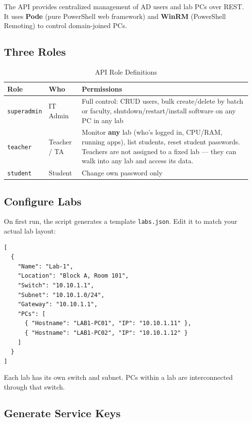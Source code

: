 ﻿\documentclass[12pt,a4paper]{article}
\begin{document}
The API provides centralized management of AD users and lab PCs over REST. It uses \textbf{Pode} (pure PowerShell web framework) and \textbf{WinRM} (PowerShell Remoting) to control domain-joined PCs.

\subsection{Three Roles}

\begin{table}[H]
\centering
\begin{tabularx}{\textwidth}{l l X}
\toprule
\textbf{Role} & \textbf{Who} & \textbf{Permissions} \\
\midrule
\texttt{superadmin} & IT Admin & Full control: CRUD users, bulk create/delete by batch or faculty, shutdown/restart/install software on any PC in any lab \\
\texttt{teacher} & Teacher / TA & Monitor \textbf{any} lab (who's logged in, CPU/RAM, running apps), list students, reset student passwords. Teachers are not assigned to a fixed lab --- they can walk into any lab and access its data. \\
\texttt{student} & Student & Change own password only \\
\bottomrule
\end{tabularx}
\caption{API Role Definitions}
\end{table}

\subsection{Configure Labs}

On first run, the script generates a template \texttt{labs.json}. Edit it to match your actual lab layout:

\begin{lstlisting}
[
  {
    "Name": "Lab-1",
    "Location": "Block A, Room 101",
    "Switch": "10.10.1.1",
    "Subnet": "10.10.1.0/24",
    "Gateway": "10.10.1.1",
    "PCs": [
      { "Hostname": "LAB1-PC01", "IP": "10.10.1.11" },
      { "Hostname": "LAB1-PC02", "IP": "10.10.1.12" }
    ]
  }
]
\end{lstlisting}

Each lab has its own switch and subnet. PCs within a lab are interconnected through that switch.

\subsection{Generate Service Keys}
\end{document}
